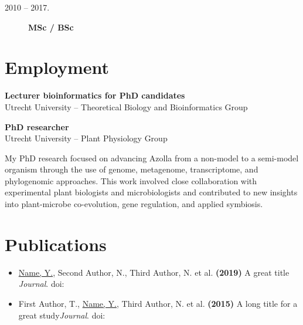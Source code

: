 \documentclass[a4paper,10pt]{article}
\begin{document}
{\begin{adjustbox}{valign=t}
\begin{minipage}[t]{0.3\textwidth}
\begin{description}
\item[\normalfont \textcolor{ColorOne}{2010 -- 2017.}] \textbf{MSc / BSc}\\
\end{description}

\vfill
\end{minipage}%
\end{adjustbox}%
\hfill%


\begin{adjustbox}{valign=t}
\hfill%
\begin{minipage}[t]{0.05\textwidth}
\MyVerticalRule
\end{minipage}%
\end{adjustbox}


\begin{adjustbox}{valign=t}
\hfill%
\begin{minipage}[t]{0.6\textwidth}
\section*{Employment}
\begin{description}
\raggedright
\item[\normalfont \textcolor{ColorOne}{2022 -- now.}] \textbf{Lecturer bioinformatics for PhD candidates} \\
Utrecht University – Theoretical Biology and Bioinformatics Group

\item[\normalfont \textcolor{ColorOne}{2017 -- 2022.}] \textbf{PhD researcher} \\
Utrecht University – Plant Physiology Group
\end{description}
My PhD research focused on advancing Azolla from a non-model to a semi-model organism through the use of genome, metagenome, transcriptome, and phylogenomic approaches. This work involved close collaboration with experimental plant biologists and microbiologists and contributed to new insights into plant-microbe co-evolution, gene regulation, and applied symbiosis.
\end{minipage}%
\end{adjustbox}%
}

\newpage

\section*{Publications}
\begin{itemize}
\item \underline{Name, Y.}, Second Author, N., Third Author, N. et al. \textbf{(2019)} A great title {\it Journal}. doi:~
\item First Author, T., \underline{Name, Y.}, Third Author, N. et al. \textbf{(2015)} A long title for a great study{\it Journal}. doi:~
\end{itemize}
\end{document}
